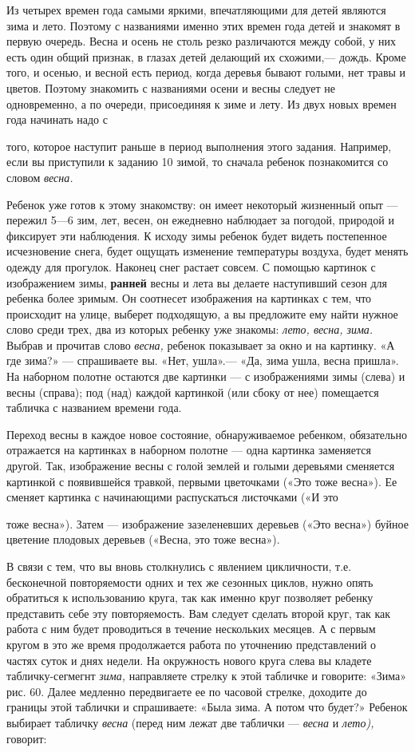 \documentclass{book}
\renewcommand{\emph}[1]{\textit{#1}}
\begin{document}
Из четырех времен года самыми яркими, впечатляющими для детей являются
зима и лето. Поэтому с названиями именно этих времен года детей и
знакомят в первую очередь. Весна и осень не столь резко различаются
между собой, у них есть один общий признак, в глазах детей делающий их
схожими,--- дождь. Кроме того, и осенью, и весной есть период, когда
деревья бывают голыми, нет травы и цветов. Поэтому знакомить с
названиями осени и весны следует не одновременно, а по очереди,
присоединяя к зиме и лету. Из двух новых времен года начинать надо с

того, которое наступит раньше в период выполнения этого задания.
Например, если вы приступили к заданию 10 зимой, то сначала ребенок
познакомится со словом \emph{весна.}

Ребенок уже готов к этому знакомству: он имеет некоторый жизненный опыт
--- пережил 5---6 зим, лет, весен, он ежедневно наблюдает за погодой,
природой и фиксирует эти наблюдения. К исходу зимы ребенок будет видеть
постепенное исчезновение снега, будет ощущать изменение температуры
воздуха, будет менять одежду для прогулок. Наконец снег растает совсем.
С помощью картинок с изображением зимы, \textbf{ранней} весны и лета вы
делаете наступивший сезон для ребенка более зримым. Он соотнесет
изображения на картинках с тем, что происходит на улице, выберет
подходящую, а вы предложите ему найти нужное слово среди трех, два из
которых ребенку уже знакомы: \emph{лето, весна, зима.} Выбрав и прочитав
слово \emph{весна,} ребенок показывает за окно и на картинку. «А где
зима?» --- спрашиваете вы. «Нет, ушла».--- «Да, зима ушла, весна
пришла». На наборном полотне остаются две картинки --- с изображениями
зимы (слева) и весны (справа); под (над) каждой картинкой (или сбоку от
нее) помещается табличка с названием времени года.

Переход весны в каждое новое состояние, обнаруживаемое ребенком,
обязательно отражается на картинках в наборном полотне --- одна картинка
заменяется другой. Так, изображение весны с голой землей и голыми
деревьями сменяется картинкой с появившейся травкой, первыми цветочками
(«Это тоже весна»). Ее сменяет картинка с начинающими распускаться
листочками («И это

тоже весна»). Затем --- изображение зазеленевших деревьев («Это весна»)
буйное цветение плодовых деревьев («Весна, это тоже весна»).


В связи с тем, что вы вновь столкнулись с явлением цикличности, т.е.
бесконечной повторяемости одних и тех же сезонных циклов, нужно опять
обратиться к использованию круга, так как именно круг позволяет ребенку
представить себе эту повторяемость. Вам следует сделать второй круг, так
как работа с ним будет проводиться в течение нескольких месяцев. А с
первым кругом в это же время продолжается работа по уточнению
представлений о частях суток и днях недели. На окружность нового круга
слева вы кладете табличку-сегмегнт \emph{зима,} направляете стрелку к
этой табличке и говорите: «Зима» рис. 60. Далее медленно передвигаете ее
по часовой стрелке, доходите до границы этой таблички и спрашиваете:
«Была зима. А потом что будет?» Ребенок выбирает табличку \emph{весна}
(перед ним лежат две таблички --- \emph{весна} и \emph{лето),} говорит:
\end{document}
